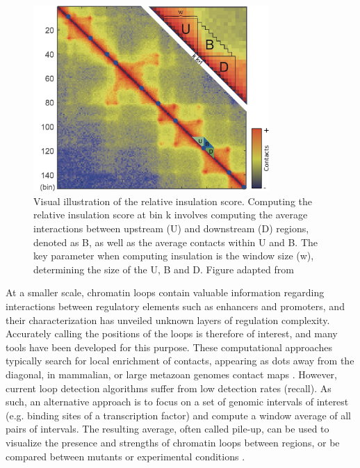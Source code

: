\begin{figure}[htb]
    \centering
    \includegraphics[width=0.8\textwidth]{Parts/Part01/gfx/insulation_score_hicdb.pdf}
    \caption[Visual illustration of the relative insulation score.]{Visual illustration of the relative insulation score. Computing the relative insulation score at bin k involves computing the average interactions between upstream (U) and downstream (D) regions, denoted as B, as well as the average contacts within U and B. The key parameter when computing insulation is the window size (w), determining the size of the U, B and D. Figure adapted from \cite{chenHiCDBSensitiveRobust2018}}
    \label{fig:01-02:insulation}
\end{figure}


At a smaller scale, chromatin loops contain valuable information regarding interactions between regulatory elements such as enhancers and promoters, and their characterization has unveiled unknown layers of regulation complexity. Accurately calling the positions of the loops is therefore of interest, and many tools have been developed for this purpose. These computational approaches typically search for local enrichment of contacts, appearing as dots away from the diagonal, in mammalian, or large metazoan genomes contact maps \cite{durandJuiceboxProvidesVisualization2016,ramirezHighresolutionTADsReveal2018}. However, current loop detection algorithms suffer from low detection rates (recall). As such, an alternative approach is to focus on a set of genomic intervals of interest (e.g. binding sites of a transcription factor) and compute a window average of all pairs of intervals. The resulting average, often called pile-up, can be used to visualize the presence and strengths of chromatin loops between regions, or be compared between mutants or experimental conditions \cite{flyamerCoolpupPyVersatile2020}.

